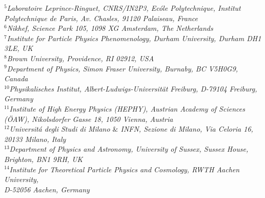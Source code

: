 \documentclass[11pt]{article}
\begin{document}
\begin{titlepage}
\begin{center}
           \textit{$^{5}$Laboratoire Leprince-Ringuet, CNRS/IN2P3, Ecóle Polytechnique, Institut Polytechnique de Paris, Av. Chasles, 91120 Palaiseau, France}\\
           \textit{$^{6}$Nikhef, Science Park 105, 1098 XG Amsterdam, The Netherlands }\\
           \textit{$^{7}$Institute for Particle Physics Phenomenology, Durham University, Durham DH1 3LE, UK}\\
           \textit{$^{8}$Brown University, Providence, RI 02912, USA} \\
           \textit{$^{9}$Department of Physics, Simon Fraser University, Burnaby, BC V5H0G9, Canada}\\
           \textit{$^{10}$Physikalisches Institut, Albert-Ludwigs-Universit\"at Freiburg, D-79104 Freiburg, Germany} \\
           \textit{$^{11}$Institute of High Energy Physics (HEPHY), Austrian Academy of Sciences (\"{O}AW), Nikolsdorfer Gasse 18, 1050 Vienna, Austria}\\
           \textit{$^{12}$Universit\'{a} degli Studi di Milano $\&$ INFN, Sezione di Milano, Via Celoria 16, 20133 Milano, Italy}\\
           \textit{$^{13}$Department of Physics and Astronomy, University of Sussex, Sussex House, Brighton, BN1 9RH, UK}\\
           \textit{$^{14}$Institute for Theoretical Particle Physics and Cosmology, RWTH Aachen University, \\D-52056 Aachen, Germany}\\
           

\end{center}
\end{titlepage}
\end{document}
